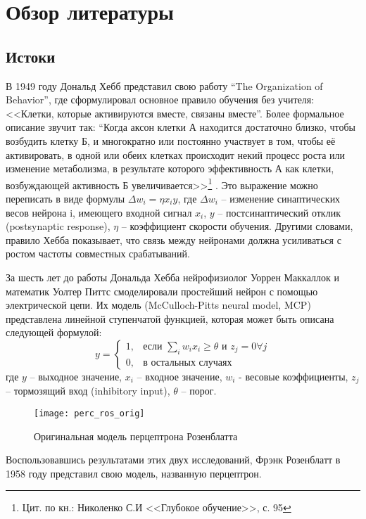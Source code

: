 \clearpage
\section{Обзор литературы}
\subsection{Истоки}
В 1949 году Дональд Хебб представил свою работу “The Organization of Behavior”\cite{hebb}, где сформулировал основное правило обучения без учителя: <<Клетки, которые активируются вместе, связаны вместе”. Более формальное описание звучит так: “Когда аксон клетки А находится достаточно близко, чтобы возбудить клетку Б, и многократно или постоянно участвует в том, чтобы её активировать, в одной или обеих клетках происходит некий процесс роста или изменение метаболизма, в результате которого эффективность А как клетки, возбуждающей активность Б увеличивается>>\footnote{Цит. по кн.: Николенко С.И <<Глубокое обучение>>, с. 95} . Это выражение можно переписать в виде формулы $\Delta w_i = \eta x_{i} y$, где $\Delta w_i$ – изменение синаптических весов нейрона i, имеющего входной сигнал $x_i$, $y$ – постсинаптический отклик (postsynaptic response),  $\eta$ -- коэффициент скорости обучения. Другими словами, правило Хебба показывает, что связь между нейронами должна усиливаться с ростом частоты совместных срабатываний. 
\par
За шесть лет до работы Дональда Хебба нейрофизиолог Уоррен Маккаллок и математик Уолтер Питтс смоделировали простейший нейрон с помощью электрической цепи. Их модель (McCulloch-Pitts neural model, MCP) представлена линейной ступенчатой функцией, которая может быть описана следующей формулой:
\begin{equation}
	y =
	\begin{cases}
		1,& \text{если } \sum_{i}{w_i x_i} \geq \theta \text{ и } z_j = 0 \forall{j} \\
		0,& \text{в остальных случаях}
	\end{cases}
\end{equation}
где $y$ – выходное значение, $x_i$ – входное значение, $w_i$ - весовые коэффициенты, $z_j$ – тормозящий вход (inhibitory input), $\theta$ -- порог.
\par
\begin{figure}[h]
	\centering
	\texttt{[image: perc\_ros\_orig]}
	\caption{Оригинальная модель перцептрона Розенблатта}
	\label{hist:rosorig}
\end{figure}
Воспользовавшись результатами этих двух исследований, Фрэнк Розенблатт в 1958 году представил свою модель, названную перцептрон\cite{perceptron}.
